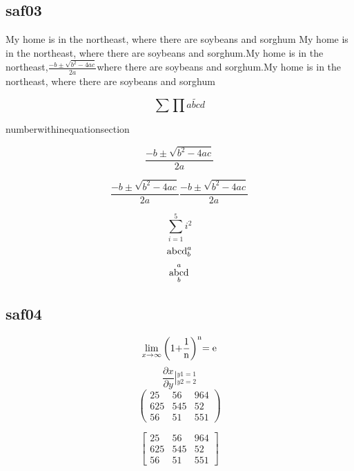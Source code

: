 \documentclass[twocolumn]{report}
\newcommand {\fc}{\frac}%
\begin{document}
\subsection{saf03}%
My home is in the northeast, where there are soybeans and sorghum My home is in the northeast, where there are soybeans and sorghum.My home is in the northeast,$\frac{{ - b \pm \sqrt {{b^2} - 4ac} }}{{2a}} $where there are soybeans and sorghum.My home is in the northeast, where there are soybeans and sorghum

$$\sum\prod \widetilde{abcd} $$

numberwithin{equation}{section}

\begin{equation}
  \fc{{ - b \pm \sqrt {{b^2} - 4ac} }}{{2a}}
\end{equation}

\begin{subequations}
 \begin{equation}\boxed{
  \frac{{ - b \pm \sqrt {{b^2} - 4ac} }}{{2a}}}
\end{equation}
\begin{equation}
  \frac{{ - b \pm \sqrt {{b^2} - 4ac} }}{{2a}}
\end{equation}
\end{subequations}

$$\sum^5_{i=1}i^2$$
$${\rm abcd}^a_b$$
$$\mathop{{\rm abcd}}^a_b$$


\subsection{saf04}%

\[\mathop {\lim }\limits_{x \to \infty } {\left( {1{\rm{ + }}\frac{1}{{\rm{n}}}} \right)^{\rm{n}}}{\rm{ = e}}\]
\[\frac{{\partial x}}{{\partial y}}\left| {_{y2 = 2}^{y1 = 1}} \right.\]
$$\left(\begin{array}{crl}
  25&56&964\\
  625&545&52\\
  56&51&551
\end{array}\right)$$

$$\begin{bmatrix}
  25&56&964\\
  625&545&52\\
  56&51&551
\end{bmatrix}$$
\end{document}
